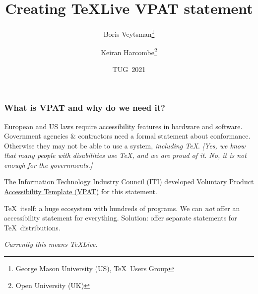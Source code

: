\documentclass{beamer}
\begin{document}
\author{Boris Veytsman\thanks{George Mason University (US),  \TeX\ Users Group }
  \and
Keiran Harcombe\thanks{Open University (UK)}}

\title{Creating \TeX Live VPAT\textsuperscript{\textregistered} statement}
\date{TUG~2021}


\begin{frame}
  \maketitle
\end{frame}

\begin{frame}
  \frametitle{What is VPAT\textsuperscript{\textregistered} and why do
    we need it?}

  
  European and US laws require accessibility features in hardware and
  software.  Government agencies \& contractors need a formal
  statement about conformance.  Otherwise they may not be able to use
  a system, \emph{including \TeX}.  \emph{[Yes, we know that many
    people with disabilities use \TeX, and we are proud of it.  No, it is
    not enough for the governments.]}

  \href{https://www.itic.org/}{The Information Technology Industry
    Council (ITI)} developed
  \href{https://www.itic.org/policy/accessibility/vpat}{Voluntary
    Product Accessibility Template
    (VPAT\textsuperscript{\textregistered})} for this statement.  

  \TeX\ itself: a huge ecosystem with hundreds of programs.  We can
  \emph{not} offer an accessibility statement for everything.
  Solution: offer separate statements for \TeX\ distributions.

  \emph{Currently this means \TeX Live.}

  
\end{frame}
\end{document}
